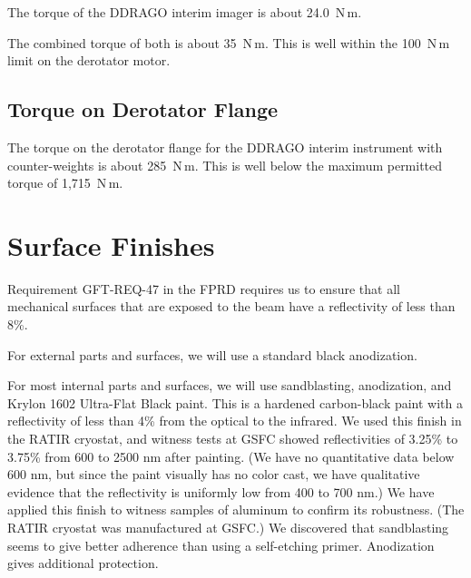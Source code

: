 \documentclass{article}
\newcommand{\unit}[1]{\ensuremath{\mathrm{#1}}}
\begin{document}
The torque of the DDRAGO interim imager is about 24.0~\unit{N\,m}.

The combined torque of both is about 35~\unit{N\,m}. This is well within the 100~\unit{N\,m} limit on the derotator motor.



\subsection{Torque on Derotator Flange}

The torque on the derotator flange for the DDRAGO interim instrument with counter-weights is about 285~\unit{N\,m}. This is well below the maximum permitted torque of 1,715~\unit{N\,m}.

\clearpage
\section{Surface Finishes}

Requirement GFT-REQ-47 in the FPRD requires us to ensure that all mechanical surfaces that are exposed to the beam have a reflectivity of less than 8\%.

For external parts and surfaces, we will use a standard black anodization. 

For most internal parts and surfaces, we will use sandblasting, anodization, and Krylon 1602 Ultra-Flat Black paint. This is a hardened carbon-black paint with a reflectivity of less than 4\% from the optical to the infrared. We used this finish in the RATIR cryostat, and witness tests at GSFC showed reflectivities of 3.25\% to 3.75\% from 600 to 2500 nm after painting. (We have no quantitative data below 600 nm, but since the paint visually has no color cast, we have qualitative evidence that the reflectivity is uniformly low from 400 to 700 nm.) We have applied this finish to witness samples of aluminum to confirm its robustness. (The RATIR cryostat was manufactured at GSFC.) We discovered that sandblasting seems to give better adherence than using a self-etching primer. Anodization gives additional protection.
\end{document}
